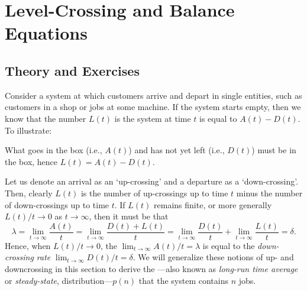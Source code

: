 \section{Level-Crossing and Balance Equations}
\label{sec:level-cross-balance}


\subsection*{Theory and Exercises}



Consider a system at which customers arrive and depart in single
entities, such as customers in a shop or jobs at some machine.  If the
system starts empty, then we know that the number $L(t)$ is the system
at time $t$ is equal to $A(t) - D(t)$. To illustrate:

\begin{figure}[h]
  \centering
{}
\end{figure}

\noindent What goes in the box (i.e., $A(t)$) and has not yet left
  (i.e., $D(t)$) must be in the box, hence $L(t)=A(t)-D(t)$. 



Let us denote an arrival as an `up-crossing' and a departure as a
`down-crossing'.  Then, clearly $L(t)$ is the number of up-crossings
up to time $t$ minus the number of down-crossings up to time $t$. If
$L(t)$ remains finite, or more generally $L(t)/t \to 0$ as $t\to\infty$, then it
must be that
\begin{equation*}
  \lambda =  \lim_{t \to \infty} \frac{A(t)}t  = \lim_{t \to \infty} \frac{D(t)+L(t)}t =  \lim_{t \to \infty} \frac{D(t)}t + \lim_{t \to \infty} \frac{L(t)}t 
  = \delta.  
\end{equation*}
Hence, when $L(t)/t\to0$, the 
$\lim_{t \to \infty} A(t)/t = \lambda$ is equal to the \emph{down-crossing rate}
$\lim_{t \to \infty} D(t)/t = \delta$.  We will generalize these notions of up- and
downcrossing in this section to derive the ---also known as \emph{long-run time average} or \emph{steady-state},
distribution---$p(n)$ that the system contains $n$ jobs. 

